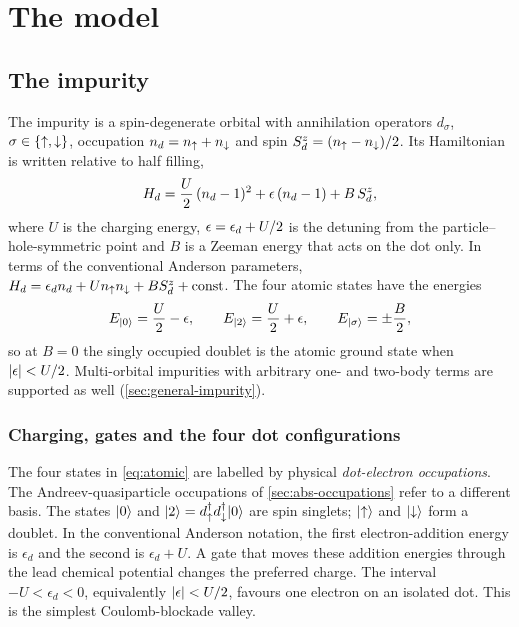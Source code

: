 \chapter{The model}\label{ch:model}

\section{The impurity}

The impurity is a spin-degenerate orbital with annihilation operators $d_\sigma$,
$\sigma\in\{{\uparrow},{\downarrow}\}$, occupation $n_d=n_{\uparrow}+n_{\downarrow}$ and spin $S^z_d=(n_{\uparrow}-n_{\downarrow})/2$.
Its Hamiltonian is written relative to half filling,
\begin{equation}\label{eq:Hd}
  H_{d}=\frac U2\,(n_d-1)^2+\epsilon\,(n_d-1)+B\,S^z_d ,
\end{equation}
where $U$ is the charging energy, $\epsilon=\epsilon_d+U/2$ is the detuning from the
particle--hole-symmetric point and $B$ is a Zeeman energy that acts on the dot only. In
terms of the conventional Anderson parameters,
$H_{d}=\epsilon_d n_d+Un_{\uparrow} n_{\downarrow}+BS^z_d+\mathrm{const}$. The four atomic states have the
energies
\begin{equation}\label{eq:atomic}
  E_{\lvert 0\rangle}=\frac U2-\epsilon,\qquad E_{\lvert 2\rangle}=\frac U2+\epsilon,\qquad E_{\lvert \sigma\rangle}=\pm\frac B2 ,
\end{equation}
so at $B=0$ the singly occupied doublet is the atomic ground state when
$\lvert \epsilon\rvert<U/2$. Multi-orbital impurities with arbitrary one- and two-body terms are
supported as well (\cref{sec:general-impurity}).

\subsection{Charging, gates and the four dot configurations}

The four states in \cref{eq:atomic} are labelled by physical \emph{dot-electron occupations}.
The Andreev-quasiparticle occupations of \cref{sec:abs-occupations} refer to a different basis.
The states $\lvert 0\rangle$ and $\lvert 2\rangle=d_{\uparrow}^\dagger d_{\downarrow}^\dagger\lvert 0\rangle$ are spin singlets;
$\lvert {\uparrow}\rangle$ and $\lvert {\downarrow}\rangle$ form a doublet. In the conventional Anderson
notation, the first electron-addition energy is $\epsilon_d$ and the second is
$\epsilon_d+U$. A gate that moves these addition energies through the lead
chemical potential changes the preferred charge. The interval
$-U<\epsilon_d<0$, equivalently $|\epsilon|<U/2$, favours one electron on an
isolated dot. This is the simplest Coulomb-blockade valley.

